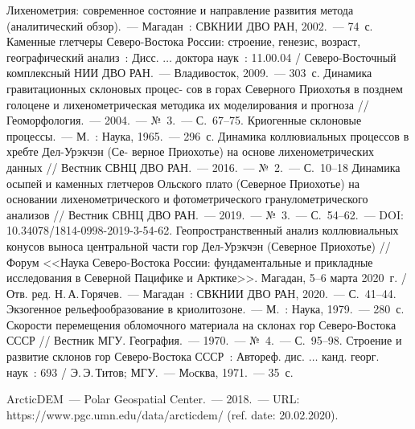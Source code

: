 \begin{thebibliography}{99}
\bibitem{} Лихенометрия: современное состояние и направление развития
метода (аналитический обзор).~--- Магадан~: СВКНИИ ДВО РАН, 2002.~--- 74~с.
\bibitem{} Каменные глетчеры Северо-Востока России: строение, генезис,
возраст, географический анализ~: Дисс. $\dots$ доктора наук~: 11.00.04 / Северо-Восточный комплексный НИИ ДВО РАН.~--- Владивосток, 2009.~--- 303~с.
\bibitem{} Динамика гравитационных склоновых процес-
сов в горах Северного Приохотья в позднем голоцене и лихенометрическая методика их моделирования и прогноза // Геоморфология.~--- 2004.~--- №~3.~--- С.~67--75.
\bibitem{} Криогенные склоновые процессы.~--- М.~: Наука, 1965.~--- 296~с.
\bibitem{} Динамика коллювиальных процессов в хребте Дел-Урэкчэн (Се-
верное Приохотье) на основе лихенометрических данных // Вестник СВНЦ ДВО РАН.~--- 2016.~--- №~2.~--- С.~10--18
\bibitem{} Динамика осыпей и каменных глетчеров Ольского плато (Северное Приохотье) на основании лихенометрического и фотометрического гранулометрического анализов // Вестник СВНЦ ДВО РАН.~--- 2019.~--- №~3.~--- С.~54–62.~--- DOI: 10.34078/1814-0998-2019-3-54-62.
\bibitem{} Геопространственный анализ коллювиальных конусов выноса центральной части гор Дел-Урэкчэн (Северное Приохотье) // Форум <<Наука Северо-Востока России: фундаментальные и прикладные исследования в Северной Пацифике и Арктике>>. Магадан, 5--6 марта 2020~г. / Отв. ред. Н.\,А.\,Горячев.~--- Магадан~: СВКНИИ ДВО РАН, 2020.~--- С.~41--44.
\bibitem{} Экзогенное рельефообразование в криолитозоне.~--- М.~:
Наука, 1979.~--- 280~с.
\bibitem{} Скорости перемещения обломочного материала на склонах гор
Северо-Востока СССР // Вестник МГУ. География.~--- 1970.~--- №~4.~--- С.~95--98.
\bibitem{} Строение и развитие склонов гор Северо-Востока СССР~: Автореф.
дис. $\dots$ канд. георг. наук~: 693 / Э.\,Э.\,Титов; МГУ.~--- Мoсква, 1971.~--- 35~с.

\bibitem{}ArcticDEM~--- Polar Geospatial Center.~--- 2018.~--- URL: https://www.pgc.umn.edu/data/arcticdem/ (ref. date: 20.02.2020).

\end{thebibliography}
\thispagestyle{empty}
